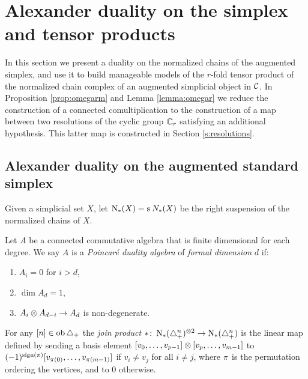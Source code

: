 
\section{Alexander duality on the simplex and tensor products}\label{s:3complexes}

In this section we present a duality on the normalized chains of the augmented simplex, and use it to build manageable models of the $r$-fold tensor product of the normalized chain complex of an augmented simplicial object in $\mathcal{C}$. In Proposition \ref{prop:omegarm} and Lemma \ref{lemma:omegar} we reduce the construction of a connected comultiplication to the construction of a map between two resolutions of the cyclic group $\mathbb{C}_r$ satisfying an additional hypothesis. This latter map is constructed in Section \ref{s:resolutions}.

\subsection{Alexander duality on the augmented standard simplex}\label{s:alexander}
Given a simplicial set $X$, let $\operatorname{N}_{*}(X) = \operatorname{s}^{}N_{*}(X)$ be the right suspension of the normalized chains of $X$.


 

\begin{definition}\label{d:poincare_duality_algebra}
	Let $A$ be a connected commutative algebra that is finite dimensional for each degree.
	We say $A$ is a \textit{Poincar\'e duality algebra} of \textit{formal dimension} $d$ if:
	\begin{enumerate}
		\item\label{i:pd1} $A_i = 0$ for $i > d$,
		\item\label{i:pd2} $\dim A_d = 1$,
		\item\label{i:pd3} $A_i \otimes A_{d-i} \to A_d$ is non-degenerate.
	\end{enumerate}
\end{definition}

\begin{definition}\label{d:join_product}
	For any $[n] \in \operatorname{ob}\triangle_{+}$ the \textit{join product} $\ast \colon \operatorname{N}_{*}(\triangle_{+}^{n})^{\otimes 2} \to \operatorname{N}_{*}(\triangle_{+}^{n})$ is the linear map defined by sending a basis element $[v_0, \dots, v_{p-1}] \otimes [v_{p},\dots,v_{m-1}]$ to $(-1)^{\operatorname{sign}(\pi)}[v_{\pi(0)}, \dots, v_{\pi(m-1)}]$	if $v_i \neq v_j$ for all $i \neq j$, where $\pi$ is the permutation ordering the vertices, and to $0$ otherwise.
\end{definition}

